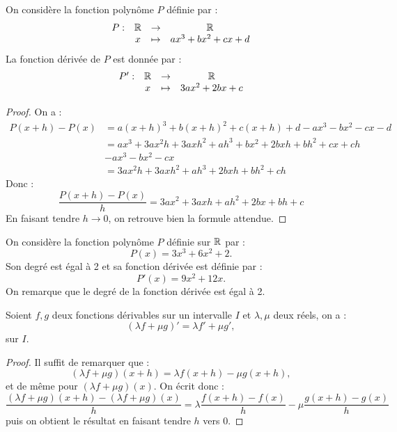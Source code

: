 \documentclass[a4paper, 12pt]{report}
\begin{document}
\begin{prop}
On considère la fonction polynôme $P$ définie par :
\[ \begin{array}{c c c c}
P : &\mathbb{R} & \to & \mathbb{R} \\
& x & \mapsto & ax^3 + bx^2 +cx + d
\end{array} \]
La fonction dérivée de $P$ est donnée par :
\[ \begin{array}{c c c c}
P' :  &\mathbb{R} & \to & \mathbb{R} \\
& x & \mapsto & 3ax^2 + 2bx +c
\end{array} \]
\end{prop}

\begin{proof}
On a :
\begin{align*}
P(x+h)-P(x) & = a(x+h)^3 + b(x+h)^2 + c(x+h) + d -ax^3 - bx^2 -cx -d \\
& = ax^3 + 3ax^2h + 3axh^2 + ah^3 + bx^2 + 2bxh + bh^2 +cx + ch \\
&  -ax^3 - bx^2 -cx \\
& = 3ax^2h + 3axh^2 + ah^3 + 2bxh + bh^2 + ch 
\end{align*}
Donc :
\[ \dfrac{P(x+h)-P(x)}{h} = 3ax^2 + 3axh + ah^2 + 2bx + bh + c \]
En faisant tendre $h \to 0$, on retrouve bien la formule attendue.
\end{proof}

\begin{ex}
On considère la fonction polynôme $P$ définie sur $\mathbb{R}$ par :
\[ P(x) = 3x^3 + 6x^2 + 2 . \]
Son degré est égal à 2 et sa fonction dérivée est définie par :
\[ P'(x) = 9x^2 + 12x  . \]
On remarque que le degré de la fonction dérivée est égal à 2.
\end{ex}

\begin{thm}
Soient $f, g$ deux fonctions dérivables sur un intervalle $I$ et $\lambda, \mu$ deux réels, on a :
\[ (\lambda f + \mu g)' = \lambda f' + \mu g' , \]
sur $I$.
\end{thm}

\begin{proof}
Il suffit de remarquer que :
\[ (\lambda f+\mu g)(x+h) = \lambda f(x+h) - \mu g(x+h) , \]
et de même pour $(\lambda f+\mu g)(x)$. On écrit donc :
\[ \dfrac{ (\lambda f+\mu g)(x+h) - (\lambda f+\mu g)(x)}{h} = \lambda \dfrac{ f(x+h) - f(x) }{h} - \mu \dfrac{ g(x+h) - g(x) }{h} \]
puis on obtient le résultat en faisant tendre $h$ vers 0.
\end{proof}
\end{document}
